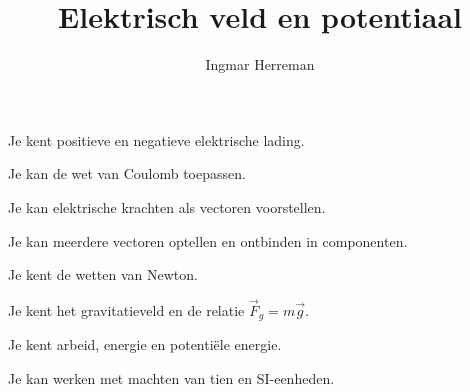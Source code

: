 \documentclass{ximera}
\title{Elektrisch veld en potentiaal}
\author{Ingmar Herreman}
\begin{document}











\maketitle



\begin{voorkennis}
  \item Je kent positieve en negatieve elektrische lading.
  \item Je kan de wet van Coulomb toepassen.
  \item Je kan elektrische krachten als vectoren voorstellen.
  \item Je kan meerdere vectoren optellen en ontbinden in componenten.
  \item Je kent de wetten van Newton.
  \item Je kent het gravitatieveld en de relatie
        $\vec F_g=m\vec g$.
  \item Je kent arbeid, energie en potentiële energie.
  \item Je kan werken met machten van tien en SI-eenheden.
\end{voorkennis}


\end{document}
